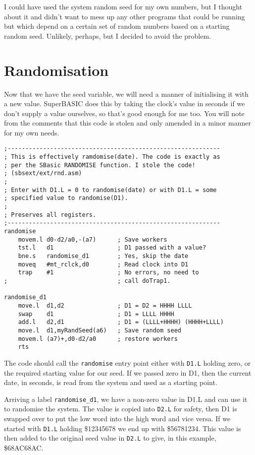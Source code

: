 I could have used the system random seed for my own numbers, but I
thought about it and didn't want to mess up any other programs that
could be running but which depend on a certain set of random numbers
based on a starting random seed. Unlikely, perhaps, but I decided
to avoid the problem.

\section{Randomisation}

Now that we have the seed variable, we will need a manner of initialising
it with a new value. SuperBASIC does this by taking the clock's value
in seconds if we don't supply a value ourselves, so that's good enough
for me too. You will note from the comments that this code is stolen
and only amended in a minor manner for my own needs.

\begin{lstlisting}[caption={Randomise function},firstnumber=24]
;------------------------------------------------------------
; This is effectively ramdomise(date). The code is exactly as
; per the SBasic RANDOMISE function. I stole the code! 
; (sbsext/ext/rnd.asm)
;
; Enter with D1.L = 0 to randomise(date) or with D1.L = some
; specified value to randomise(D1).
;
; Preserves all registers.
;------------------------------------------------------------
randomise
    movem.l d0-d2/a0,-(a7)      ; Save workers
    tst.l   d1                  ; D1 passed with a value?
    bne.s   randomise_d1        ; Yes, skip the date
    moveq   #mt_rclck,d0        ; Read clock into D1
    trap    #1                  ; No errors, no need to
;                               ; call doTrap1.

randomise_d1
    move.l  d1,d2               ; D1 = D2 = HHHH LLLL
    swap    d1                  ; D1 = LLLL HHHH
    add.l   d2,d1               ; D1 = (LLLL+HHHH) (HHHH+LLLL)
    move.l  d1,myRandSeed(a6)   ; Save random seed
    movem.l (a7)+,d0-d2/a0      ; restore workers
    rts

\end{lstlisting}

The code should call the \lstinline!randomise! entry point either
with \lstinline!D1.L! holding zero, or the required starting value
for our seed. If we passed zero in D1, then the current date, in seconds,
is read from the system and used as a starting point.

Arriving a label \lstinline!randomise_d1!, we have a non-zero value
in D1.L and can use it to randomise the system. The value is copied
into \lstinline!D2.L! for safety, then D1 is swapped over to put
the low word into the high word and vice versa. If we started with
\lstinline!D1.L! holding \$12345678 we end up with \$56781234. This
value is then added to the original seed value in \lstinline!D2.L!
to give, in this example, \$68AC68AC.

